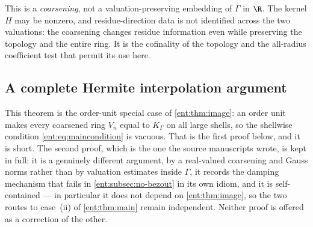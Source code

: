 \documentclass[11pt]{article}
\theoremstyle{plain}
\theoremstyle{plain}
\theoremstyle{plain}
\theoremstyle{definition}
\theoremstyle{definition}
\theoremstyle{definition}
\theoremstyle{definition}
\theoremstyle{remark}
\newcommand{\K}{K_\Gamma}\newcommand{\KD}{K_\Delta}
\begin{document}
This is a \emph{coarsening}, not a valuation-preserving embedding of $\Gamma$
in $\R$. The kernel $H$ may be nonzero, and residue-direction data is not
identified across the two valuations: the coarsening changes residue
information even while preserving the topology and the entire ring. It is the
cofinality of the topology and the all-radius coefficient test that permit
its use here.

\subsection{A complete Hermite interpolation argument}
This theorem is the order-unit special case of \cref{ent:thm:image}: an order
unit makes every coarsened ring $V_n$ equal to $\K$ on all large shells, so
the shellwise condition \eqref{ent:eq:maincondition} is vacuous. That is the
first proof below, and it is short. The second proof, which is the one the
source manuscripts wrote, is kept in full: it is a genuinely different
argument, by a real-valued coarsening and Gauss norms rather than by
valuation estimates inside $\Gamma$, it records the damping mechanism that
fails in \cref{ent:subsec:no-bezout} in its own idiom, and it is
self-contained --- in particular it does not depend on \cref{ent:thm:image},
so the two routes to case~(ii) of \cref{ent:thm:main} remain independent.
Neither proof is offered as a correction of the other.
\end{document}
